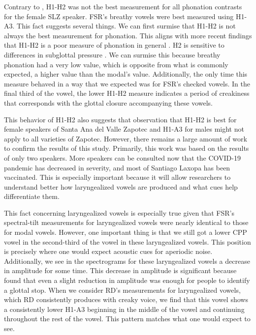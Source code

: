 \documentclass[12pt, letterpaper]{article}
\begin{document}
Contrary to \citet{espositoVariationContrastivePhonation2010}, H1-H2 was not the best measurement for all phonation contrasts for the female SLZ speaker. FSR's breathy vowels were best measured using H1-A3. This fact suggests several things. We can first surmise that H1-H2 is not always the best measurement for phonation. This aligns with more recent findings that H1-H2 is a poor measure of phonation in general \citep{chaiH1H2Acoustic2022}. H2 is sensitive to differences in subglottal pressure \citep{sundbergObjectiveCharacterizationPhonation2022}. We can surmise this because breathy phonation had a very low value, which is opposite from what is commonly expected, a higher value than the modal's value. Additionally, the only time this measure behaved in a way that we expected was for FSR's checked vowels. In the final third of the vowel, the lower H1-H2 measure indicates a period of creakiness that corresponds with the glottal closure accompanying these vowels. 

This behavior of H1-H2 also suggests that  observation that H1-H2 is best for female speakers of Santa Ana del Valle Zapotec and H1-A3 for males might not apply to all varieties of Zapotec. However, there remains a large amount of work to confirm the results of this study. Primarily, this work was based on the results of only two speakers. More speakers can be consulted now that the COVID-19 pandemic has decreased in severity, and most of Santiago Laxopa has been vaccinated. This is especially important because it will allow researchers to understand better how laryngealized vowels are produced and what cues help differentiate them. 

This fact concerning laryngealized vowels is especially true given that FSR's spectral-tilt measurements for laryngealized vowels were nearly identical to those for modal vowels. However, one important thing is that we still got a lower CPP vowel in the second-third of the vowel in these laryngealized vowels. This position is precisely where one would expect acoustic cues for aperiodic noise. Additionally, we see in the spectrograms for these laryngealized vowels a decrease in amplitude for some time. This decrease in amplitude is significant because \citet{gerfenProductionPerceptionLaryngealized2005} found that even a slight reduction in amplitude was enough for people to identify a glottal stop. When we consider RD's measurements for laryngealized vowels, which RD consistently produces with creaky voice, we find that this vowel shows a consistently lower H1-A3 beginning in the middle of the vowel and continuing throughout the rest of the vowel. This pattern matches what one would expect to see.
\end{document}
